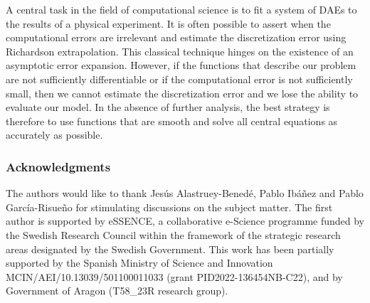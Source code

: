 \documentclass[runningheads]{llncs}
\begin{document}
A central task in the field of computational science is to fit a system of DAEs to the results of a physical experiment. It is often possible to assert when the computational errors are irrelevant and estimate the discretization error using Richardson extrapolation. This classical technique hinges on the existence of an asymptotic error expansion. However, if the functions that describe our problem are not sufficiently differentiable or if the computational error is not sufficiently small, then we cannot estimate the discretization error and we lose the ability to evaluate our model. In the absence of further analysis, the best strategy is therefore to use functions that are smooth and solve all central equations as accurately as possible.

\subsubsection{Acknowledgments}

The authors would like to thank Jesús Alastruey-Benedé, Pablo Ibáñez and Pablo García-Risueño for stimulating discussions on the subject matter.
The first author is supported by eSSENCE, a collaborative e-Science programme funded by the Swedish Research Council within the framework of the strategic research areas designated by the Swedish Government.
This work has been partially supported by the Spanish Ministry of Science and Innovation MCIN/AEI/10.13039/501100011033 (grant PID2022-136454NB-C22), and by Government of Aragon (T58_23R research group).

%
%
%


 
\end{document}
